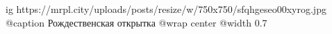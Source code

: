  
 
 
 
 

\ifcmt
  ig https://mrpl.city/uploads/posts/resize/w/750x750/sfqhgeseo00xyrog.jpg
	@caption Рождественская открытка
  @wrap center
  @width 0.7
\fi
